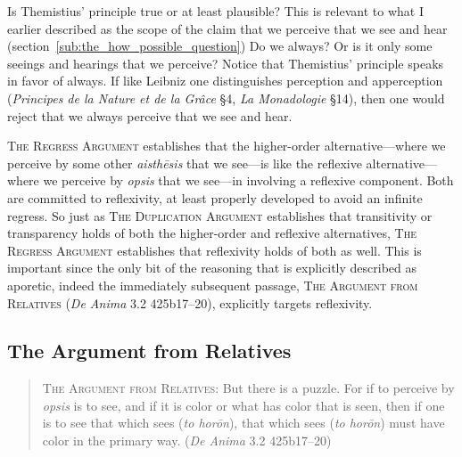 Is Themistius' principle true or at least plausible? This is relevant to what I earlier described as the scope of the claim that we perceive that we see and hear (section~\ref{sub:the_how_possible_question}) Do we always? Or is it only some seeings and hearings that we perceive? Notice that Themistius' principle speaks in favor of always. If like Leibniz one distinguishes perception and apperception (\emph{Principes de la Nature et de la Grâce} §4, \emph{La Monadologie} §14), then one would reject that we always perceive that we see and hear.

\textsc{The Regress Argument} establishes that the higher-order alternative—where we perceive by some other \emph{aisthēsis} that we see—is like the reflexive alternative—where we perceive by \emph{opsis} that we see—in involving a reflexive component. Both are committed to reflexivity, at least properly developed to avoid an infinite regress. So just as \textsc{The Duplication Argument} establishes that transitivity or transparency holds of both the higher-order and reflexive alternatives, \textsc{The Regress Argument} establishes that reflexivity holds of both as well. This is important since the only bit of the reasoning that is explicitly described as aporetic, indeed the immediately subsequent passage, \textsc{The Argument from Relatives} (\emph{De Anima} 3.2 425b17–20), explicitly targets reflexivity.


\subsection{The Argument from Relatives} %
\label{sub:the_argument_from_relatives}

\begin{quote}
	\textsc{The Argument from Relatives}: But there is a puzzle. For if to perceive by \emph{opsis} is to see, and if it is color or what has color that is seen, then if one is to see that which sees (\emph{to horōn}), that which sees (\emph{to horōn}) must have color in the primary way. (\emph{De Anima} 3.2 425b17–20)
\end{quote}

